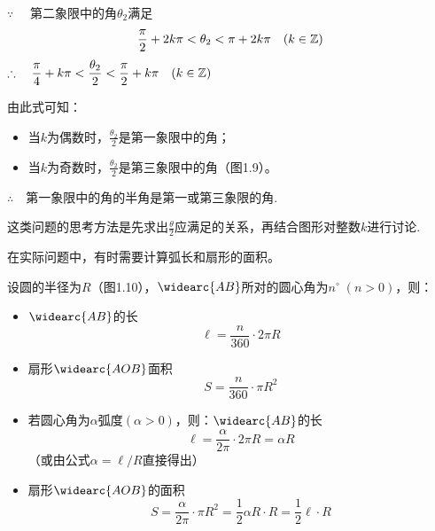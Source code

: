\begin{solution}

    \noindent
\begin{minipage}{.55\textwidth}
$\because\quad$ 第二象限中的角$\theta_2$满足
\[ \dfrac{\pi}{2}+2k\pi<\theta_2<\pi+2k\pi\quad (k\in\mathbb{Z})\]
$\therefore\quad \dfrac{\pi}{4}+k\pi<\dfrac{\theta_2}{2}<\dfrac{\pi}{2}+k\pi\quad (k\in\mathbb{Z})$

由此式可知：
\begin{itemize}
    \item 当$k$为偶数时，$\frac{\theta_2}{2}$是第一象限中的角；
    \item 当$k$为奇数时，$\frac{\theta_2}{2}$是第三象限中的角（图1.9）。
\end{itemize}

$\therefore\quad $第一象限中的角的半角是第一或第三象限的角.    
\end{minipage}
\hfill
\begin{minipage}{.4\textwidth}
    \centering
{}
\end{minipage}
\end{solution}

\begin{remark}
    这类问题的思考方法是先求出$\frac{\theta}{2}$应满足的关系，再结合图形对整数$k$进行讨论.
\end{remark}

在实际问题中，有时需要计算弧长和扇形的面积。

设圆的半径为$R$（图1.10），$\widearc{AB}$所对的圆心角为$n^{\circ}\; (n>0)$，则：
\begin{itemize}
    \item $\widearc{AB}$的长  \[\ell=\frac{n}{360}\cdot 2\pi R\]
    \item 扇形$\widearc{AOB}$面积 \[S=\frac{n}{360}\cdot \pi R^2\]
    \item 若圆心角为$\alpha$弧度$(\alpha>0)$，则：$\widearc{AB}$的长 \[\ell=\frac{\alpha}{2\pi}\cdot 2\pi R=\alpha R\] （或由公式$\alpha=\ell/R$直接得出）
    \item 扇形$\widearc{AOB}$的面积 \[S=\frac{\alpha}{2\pi}\cdot \pi R^2=\frac{1}{2}\alpha R\cdot R=\frac{1}{2}\ell\cdot R\]
\end{itemize}


